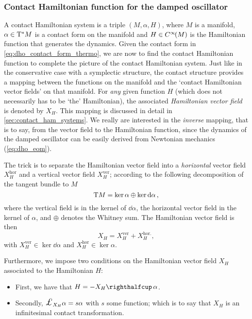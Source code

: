 \subsubsection{Contact Hamiltonian function for the damped oscillator}
A contact Hamiltonian system is a triple $(M, \alpha, H)$, where $M$ is a manifold, $\alpha \in \mathrm{T}^*M$ is a contact form on the manifold and $H \in C^\infty\!\qty(M)$ is the Hamiltonian function that generates the dynamics. Given the contact form in \cref{eq:dho_contact_form_thermo}, we are now to find the contact Hamiltonian function to complete the picture of the contact Hamiltonian system. Just like in the conservative case with a symplectic structure, the contact structure provides a mapping between the functions on the manifold and the `contact Hamiltonian vector fields' on that manifold. For \emph{any} given function $H$ (which does not necessarily has to be `the' Hamiltonian), the associated \emph{Hamiltonian vector field} is denoted by $X_H$. This mapping is discussed in detail in \cref{sec:contact_ham_systems}. We really are interested in the \emph{inverse} mapping, that is to say, from the vector field to the Hamiltonian function, since the dynamics of the damped oscillator can be easily derived from Newtonian mechanics (\cref{eq:dho_eom}). 

The trick is to separate the Hamiltonian vector field into a \emph{horizontal} vector field $X^\text{hor}_H$  and a vertical vector field $X^\text{ver}_H$; according to the following decomposition of the tangent bundle to $M$ \cite{Libermann1987}
$$ \mathrm{T}M = \ker \alpha \oplus \ker \dd{\alpha},$$
where the vertical field is in the kernel of $ \dd{\alpha}$, the horizontal vector field in the kernel of $\alpha$, and $\oplus$ denotes the Whitney sum. The Hamiltonian vector field is then 
$$ X_H = X_H^\text{ver} + X_H^\text{hor.}, $$
with $X_H^\text{ver} \in \ker \dd{\alpha}$ and $X_H^\text{hor} \in \ker \alpha$.

Furthermore, we impose two conditions on the Hamiltonian vector field $X_H$ associated to the Hamiltonian $H$:
\begin{itemize}
    \item First, we have that $ H = -\intpr{X_H}{\alpha} $. 
    \item Secondly, $\lied{X_H}\alpha = s \alpha $ with $s$ some function; which is to say that $X_H$ is an infinitesimal contact transformation. 
\end{itemize}


